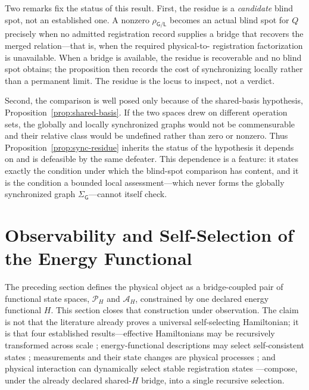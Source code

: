 \documentclass[10pt,twoside,a5paper]{article}
\newcommand{\Pspace}{\ensuremath{\mathcal P_H}}
\newcommand{\ARspace}{\ensuremath{\mathcal A_H}}
\theoremstyle{definition}
\begin{document}
Two remarks fix the status of this result. First, the residue is a \emph{candidate}
blind spot, not an established one. A nonzero $\rho_{\mathsf{G}/\mathsf{L}}$ becomes an
actual blind spot for $Q$ precisely when no admitted registration record supplies a
bridge that recovers the merged relation---that is, when the required physical-to-%
registration factorization is unavailable. When a bridge is available, the residue is
recoverable and no blind spot obtains; the proposition then records the cost of
synchronizing locally rather than a permanent limit. The residue is the locus to
inspect, not a verdict.

Second, the comparison is well posed only because of the shared-basis hypothesis,
Proposition~\ref{prop:shared-basis}. If the two spaces drew on different operation
sets, the globally and locally synchronized graphs would not be commensurable and
their relative class would be undefined rather than zero or nonzero. Thus
Proposition~\ref{prop:sync-residue} inherits the status of the hypothesis it depends
on and is defeasible by the same defeater. This dependence is a feature: it states
exactly the condition under which the blind-spot comparison has content, and it is the
condition a bounded local assessment---which never forms the globally synchronized
graph $\Sigma_{\mathsf{G}}$---cannot itself check.

\section{Observability and Self-Selection of the Energy Functional}
\label{sec:observability-self-selection-energy-functional}

The preceding section defines the physical object as a bridge-coupled pair of
functional state spaces, \Pspace{} and \ARspace{}, constrained by one declared
energy functional $H$. This section closes that construction under
observation. The claim is not that the literature already proves a universal
self-selecting Hamiltonian; it is that four established results---effective
Hamiltonians may be recursively transformed across scale
\cite{Kadanoff1966,Wilson1971}; energy-functional descriptions may select
self-consistent states \cite{HohenbergKohn1964,KohnSham1965}; measurements and
their state changes are physical processes \cite{DaviesLewis1970,Ozawa1984};
and physical interaction can dynamically select stable registration states
\cite{Zurek1982}---compose, under the already declared shared-$H$ bridge, into
a single recursive selection.
\end{document}

